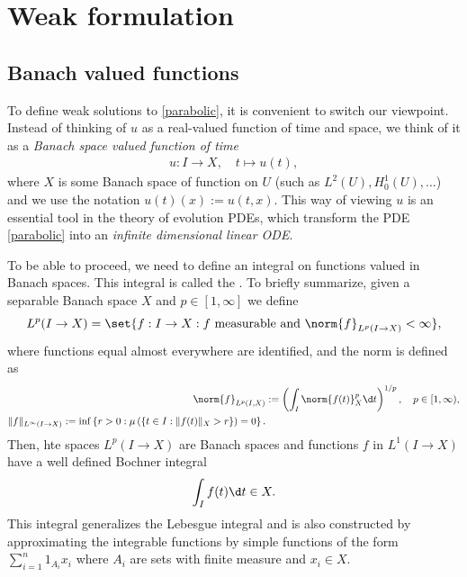 \documentclass[
    a4paper,
    DIV=14,
    abstract=true,
    numbers=noenddot
]{scrartcl}
\begin{document}
\section{Weak formulation}
\subsection{Banach valued functions}
To define weak solutions to \eqref{parabolic}, it is convenient to switch our viewpoint. Instead of thinking of $u$ as a real-valued function of time and space, we think of it as a \emph{Banach space valued function of time}
\begin{align*}
 u: I \to X, \quad t \mapsto u(t),
\end{align*}
where $X$ is some Banach space of function on $U$ (such as $L^2(U), H_0^1(U),...$) and we use the notation $u(t)(x):= u(t,x)$. This way of viewing $u$ is an essential tool in the theory of evolution PDEs, which transform the PDE \eqref{parabolic} into an \emph{infinite dimensional linear ODE}.

To be able to proceed, we need to define an integral on functions valued in Banach spaces. This integral is called the . To briefly summarize,
given a separable Banach space $X$ and $p \in [1, \infty]$ we define
\begin{align}\label{dual}
 L^p(I \to X)= \set{f: I \to X: f \text{ measurable and } \norm{f}_{L^p(I \to X)}< \infty},
\end{align} 
where functions equal almost everywhere are identified, and the norm is defined as
\begin{align*}
\norm{f}_{L^p(I,X)}  &:= \left( \int_I \norm{f(t)}_X^p \d t \right)^{1/p}, \quad p \in [1, \infty),\\
  \|f\|_{L^{\infty}(I\rightarrow X)}:=\inf \left\{r>0: \mu\left(\{t \in I : \|f(t)\|_X > r\}\right)=0\right\}.
\end{align*}
Then, hte spaces $L^p(I \to X)$ are Banach spaces and functions $f$ in $L^1(I \to X)$ have a well defined Bochner integral
\begin{align*}
  \int_I f(t) \d t \in X.
\end{align*}
This integral generalizes the Lebesgue integral and is also constructed by approximating the integrable functions by simple functions of the form $\sum_{i=1}^n 1_{A_i} x_i$ where $A_i$ are sets with finite measure and $x_i \in X$.
\end{document}

